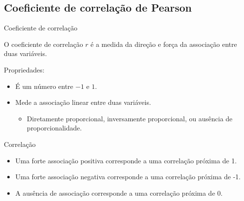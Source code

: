 \documentclass{beamer}
\begin{document}

\subsection[Pearson]{Coeficiente de correlação de Pearson}

\begin{frame}{Coeficiente de correlação}
  \begin{definition}
    O coeficiente de correlação $r$ é a medida da direção e força da
    associação entre duas variáveis.
  \end{definition}
  Propriedades:
  \begin{itemize}
  \item É um número entre $-1$ e $1$.
  \item Mede a associação \alert{linear} entre duas variáveis.
    \begin{itemize}
    \item Diretamente proporcional, inversamente proporcional, ou
      ausência de proporcionalidade.
    \end{itemize}
  \end{itemize}
\end{frame}


\begin{frame}{Correlação}
  \begin{block}{}
    \begin{itemize}
    \item Uma forte associação \alert<2>{positiva} corresponde a uma correlação
      próxima de \alert<2>{1}.
    \item Uma forte associação \alert<3>{negativa} corresponde a uma correlação
      próxima de \alert<3>{-1}.
    \item A \alert<4>{ausência} de associação corresponde a uma
      correlação próxima de \alert<4>{0}.
    \end{itemize}
  \end{block}
\end{frame}
\end{document}
